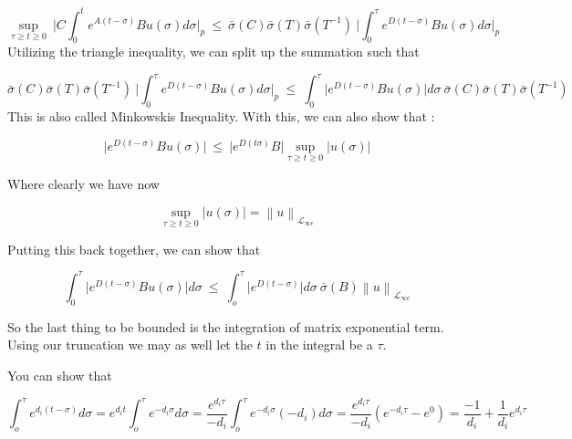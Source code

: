 \documentclass[11pt]{article}
\newcommand{\norm}[1]{\left\lVert#1\right\rVert}
\begin{document}
\begin{equation}
	\sup_{\tau \geq t \geq0} \ \rvert C \int_0^t e^{A(t-\sigma)}Bu(\sigma)d\sigma \rvert_p \ \leq \ \bar{\sigma}(C) \bar{\sigma}(T) \bar{\sigma}(T^{-1})   \ \bigg \rvert \int_0^\tau e^{D(t-\sigma)}Bu(\sigma)d\sigma \bigg \rvert_p
\end{equation}
Utilizing the triangle inequality, we can split up the summation such that 


\begin{equation}
	\bar{\sigma}(C) \bar{\sigma}(T) \bar{\sigma}(T^{-1})   \ \bigg \rvert \int_0^\tau e^{D(t-\sigma)}Bu(\sigma)d\sigma \bigg \rvert_p \ \leq \ \int_0^\tau \bigg \rvert e^{D(t-\sigma)} B u(\sigma) \bigg \rvert d\sigma \  \bar{\sigma}(C) \bar{\sigma}(T) \bar{\sigma}(T^{-1})
\end{equation}
This is also called Minkowskis Inequality.	With this, we can also show that :

\begin{equation}
	\bigg \rvert e^{D(t-\sigma)} B u(\sigma) \bigg \rvert \ \leq \ \bigg \rvert e^{D(t\sigma)}B \bigg \rvert \sup_{\tau \geq t \geq 0} \big \rvert u(\sigma) \big \rvert
\end{equation}
 

Where clearly we have now

\begin{equation}
\sup_{\tau \geq t \geq 0} \big \rvert u(\sigma) \big \rvert = \norm{u}_{\mathcal{L}_{\infty e}}
\end{equation}

Putting this back together, we can show that

\begin{equation}
\int_0^\tau \bigg \rvert e^{D(t-\sigma)} B u(\sigma) \bigg \rvert d\sigma \ \leq \ \int_o^\tau \big \rvert e^{D(t-\sigma)} \big \rvert d\sigma \ \bar{\sigma}(B) \norm{u}_{\mathcal{L}_{\infty e}}
\end{equation}

So the last thing to be bounded is the integration of matrix exponential term. Using our truncation we may as well let the $t$ in the integral be a $\tau$.

You can show that 

\begin{equation}
	\int_o^\tau e^{d_i(t-\sigma)} d\sigma = e^{d_it} \int_o^\tau e^{-d_i \sigma} d\sigma = \frac{e^{d_i \tau}}{-d_i} \int_o^\tau e^{-d_i\sigma} (-d_i)d\sigma = \frac{e^{d_i\tau}}{-d_i}(e^{-d_i\tau} - e^{0}) = \frac{-1}{d_i} + \frac{1}{d_i}e^{d_i\tau} 
\end{equation}
\end{document}
